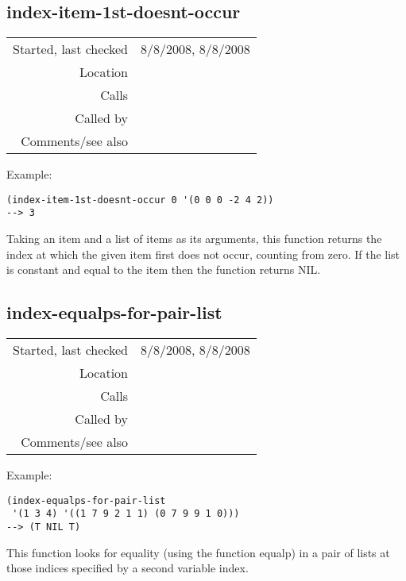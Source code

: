 \subsection*{index-item-1st-doesnt-occur}\label{fun:index-item-1st-doesnt-occur}

\vspace{0.3cm}
\begin{tabular}{r|p{8cm}}
Started, last checked & 8/8/2008, 8/8/2008 \\
Location & \nameref{sec:sort-by} \\
Calls & \\
Called by & \\
Comments/see also & \nameref{fun:index-item-1st-occurs}
\end{tabular}

\vspace{0.5cm}
\noindent Example:
\begin{verbatim}
(index-item-1st-doesnt-occur 0 '(0 0 0 -2 4 2))
--> 3
\end{verbatim}

\noindent Taking an item and a list of items as its
arguments, this function returns the index at which
the given item first does not occur, counting from
zero. If the list is constant and equal to the item
then the function returns NIL.


\subsection*{index-equalps-for-pair-list}\label{fun:index-equalps-for-pair-list}

\vspace{0.3cm}
\begin{tabular}{r|p{8cm}}
Started, last checked & 8/8/2008, 8/8/2008 \\
Location & \nameref{sec:sort-by} \\
Calls & \\
Called by & \nameref{fun:nos-consecutives-with-nonempty-fixed} \\
Comments/see also &
\end{tabular}

\vspace{0.5cm}
\noindent Example:
\begin{verbatim}
(index-equalps-for-pair-list
 '(1 3 4) '((1 7 9 2 1 1) (0 7 9 9 1 0)))
--> (T NIL T)
\end{verbatim}

\noindent This function looks for equality (using the
function equalp) in a pair of lists at those indices
specified by a second variable index.


